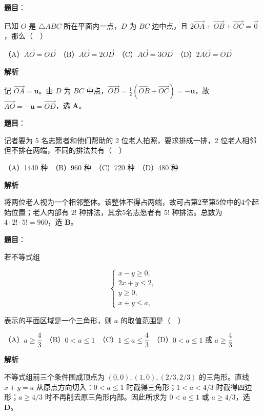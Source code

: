 \begin{answer}

\textbf{题目}：

已知 $O$ 是 $\triangle ABC$ 所在平面内一点，$D$ 为 $BC$ 边中点，且
$2\overrightarrow{OA}+\overrightarrow{OB}+\overrightarrow{OC}=\vec{0}$，那么（　）

（A）$\overrightarrow{AO}=\overrightarrow{OD}$　（B）$\overrightarrow{AO}=2\overrightarrow{OD}$　（C）$\overrightarrow{AO}=3\overrightarrow{OD}$　（D）$2\overrightarrow{AO}=\overrightarrow{OD}$

\textbf{解析}

记 $\overrightarrow{OA}=\mathbf u$。由 $D$ 为 $BC$ 中点，$\overrightarrow{OD}=\tfrac12(\overrightarrow{OB}+\overrightarrow{OC})=-\mathbf u$，故 $\overrightarrow{AO}=-\mathbf u=\overrightarrow{OD}$，选 \textbf{A}。


\end{answer}
\begin{answer}

\textbf{题目}：

记者要为 5 名志愿者和他们帮助的 2 位老人拍照，要求排成一排，2 位老人相邻但不排在两端，不同的排法共有（　）

（A）1440 种　（B）960 种　（C）720 种　（D）480 种

\textbf{解析}

将两位老人视为一个相邻整体。该整体不得占两端，故可占第2至第5位中的4个起始位置；老人内部有 $2!$ 种排法，其余5名志愿者有 $5!$ 种排法。总数为 $4\cdot2!\cdot5!=960$，选 \textbf{B}。


\end{answer}
\begin{answer}

\textbf{题目}：

若不等式组

\nopagebreak[4]
\[
\begin{cases}
x-y\geq 0,\\
2x+y\leq 2,\\
y\geq 0,\\
x+y\leq a,
\end{cases}
\]

表示的平面区域是一个三角形，则 $a$ 的取值范围是（　）

（A）$a\geq\dfrac43$　（B）$0<a\leq 1$　（C）$1\leq a\leq\dfrac43$　（D）$0<a\leq 1$ 或 $a\geq\dfrac43$

\textbf{解析}

不等式组前三个条件围成顶点为 $(0,0),(1,0),(2/3,2/3)$ 的三角形。直线 $x+y=a$ 从原点方向切入：$0<a\le1$ 时截得三角形；$1<a<4/3$ 时截得四边形；$a\ge4/3$ 时不再削去原三角形内部。因此所求为 $0<a\le1$ 或 $a\ge4/3$，选 \textbf{D}。


\end{answer}
